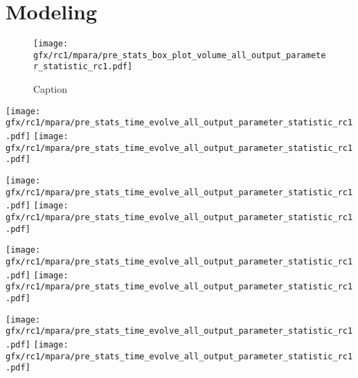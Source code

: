 \chapter{Modeling} %
\label{app:modelAnalysis}
%
%
%
%
\begin{figure}[!ht]
    \centering
    \texttt{[image: gfx/rc1/mpara/pre\_stats\_box\_plot\_volume\_all\_output\_parameter\_statistic\_rc1.pdf]}
    \caption[]{Caption}
    \label{app:appModelVolumeBoxPlot}
\end{figure}
%
%
%
%
%
\setlength{\tikzwidth}{\textwidth}
\begin{sidewaysfigure}[!ht]
\centering
\texttt{[image: gfx/rc1/mpara/pre\_stats\_time\_evolve\_all\_output\_parameter\_statistic\_rc1.pdf]}
\texttt{[image: gfx/rc1/mpara/pre\_stats\_time\_evolve\_all\_output\_parameter\_statistic\_rc1.pdf]}
\label{app:pste1}
\end{sidewaysfigure}
%
\begin{sidewaysfigure}[!ht]
\centering
\texttt{[image: gfx/rc1/mpara/pre\_stats\_time\_evolve\_all\_output\_parameter\_statistic\_rc1.pdf]}
\texttt{[image: gfx/rc1/mpara/pre\_stats\_time\_evolve\_all\_output\_parameter\_statistic\_rc1.pdf]}
\label{app:pste2}
\end{sidewaysfigure}
%
\begin{sidewaysfigure}[!ht]
\centering
\texttt{[image: gfx/rc1/mpara/pre\_stats\_time\_evolve\_all\_output\_parameter\_statistic\_rc1.pdf]}
\texttt{[image: gfx/rc1/mpara/pre\_stats\_time\_evolve\_all\_output\_parameter\_statistic\_rc1.pdf]}
\label{app:pste3}
\end{sidewaysfigure}
%
\begin{sidewaysfigure}[!ht]
\centering
\texttt{[image: gfx/rc1/mpara/pre\_stats\_time\_evolve\_all\_output\_parameter\_statistic\_rc1.pdf]}
\texttt{[image: gfx/rc1/mpara/pre\_stats\_time\_evolve\_all\_output\_parameter\_statistic\_rc1.pdf]}
\label{app:pste4}
\end{sidewaysfigure}
